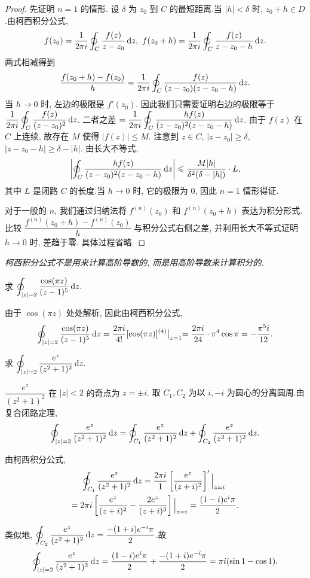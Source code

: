 \documentclass[nocolor,theme=doremi,lang=cn,11pt,chinese,twoside,openright,usesamecnt]{elegantbook}
\newcommand\peq{\mathrel{\phantom{=}}} %
\begin{document}
\begin{proof}
	先证明 $n=1$ 的情形.
	设 $\delta$ 为 $z_0$ 到 $C$ 的最短距离.当 $|h|<\delta$ 时, $z_0+h\in D$.由柯西积分公式,
		\[f(z_0)=\frac1{2\pi i}\oint_C\frac{f(z)}{z-z_0}\diff z,\ 
		f(z_0+h)=\frac1{2\pi i}\oint_C\frac{f(z)}{z-z_0-h}\diff z.\]
	两式相减得到
		\[\frac{f(z_0+h)-f(z_0)}h=\frac1{2\pi i}\oint_C\frac{f(z)}{(z-z_0)(z-z_0-h)}\,\mathrm{d} z.\]
	当 $h\to 0$ 时, 左边的极限是 $f'(z_0)$. 因此我们只需要证明右边的极限等于 $\displaystyle\frac1{2\pi i}\oint_C\frac{f(z)}{(z-z_0)^2}\,\mathrm{d} z$.
	二者之差 $=\displaystyle\frac1{2\pi i}\oint_C\frac{h f(z)}{(z-z_0)^2(z-z_0-h)}\,\mathrm{d} z$.
	由于 $f(z)$ 在 $C$ 上连续, 故存在 $M$ 使得 $|f(z)|\le M$. 注意到 $z\in C$, $|z-z_0|\ge \delta$, $|z-z_0-h|\ge\delta-|h|$. 由长大不等式,
		\[\left|\oint_C\frac{h f(z)}{(z-z_0)^2(z-z_0-h)}\,\mathrm{d} z\right|\leqslant\frac{M|h|}{\delta^2(\delta-|h|)}\cdot L,\]
	其中 $L$ 是闭路 $C$ 的长度.当 $h\to0$ 时, 它的极限为 $0$, 因此 $n=1$ 情形得证.

	对于一般的 $n$, 我们通过归纳法将 $f^{(n)}(z_0)$ 和 $f^{(n)}(z_0+h)$ 表达为积分形式. 比较 $\dfrac{f^{(n)}(z_0+h)-f^{(n)}(z_0)}h$ 与积分公式右侧之差, 并利用长大不等式证明 $h\to 0$ 时, 差趋于零. 具体过程省略.
\end{proof}

\emph{柯西积分公式不是用来计算高阶导数的, 而是用高阶导数来计算积分的.}

\begin{example}
	求 $\displaystyle\oint_{|z|=2}\frac{\cos(\pi z)}{(z-1)^5}\,\mathrm{d} z.$
\end{example}

\begin{solution}
	由于 $\cos(\pi z)$ 处处解析,
	{因此由柯西积分公式,
		\[
		\oint_{|z|=2}\frac{\cos(\pi z)}{(z-1)^5}\,\mathrm{d} z
		=\frac{2\pi i}{4!}[\cos(\pi z)]^{(4)}\big|_{z=1}
		{=\frac{2\pi i}{24}\cdot \pi^4\cos \pi=-\frac{\pi^5 i}{12}.}
		\]}
\end{solution}

\begin{example}
	求 $\displaystyle\oint_{|z|=2}\frac{e^z}{(z^2+1)^2}\,\mathrm{d} z.$
\end{example}

\begin{solution}
	$\dfrac{e^z}{(z^2+1)^2}$ 在 $|z|<2$ 的奇点为 $z=\pm i$.
	{取 $C_1,C_2$ 为以 $i,-i$ 为圆心的分离圆周.由复合闭路定理,
		\[\oint_{|z|=2}\frac{e^z}{(z^2+1)^2}\,\mathrm{d} z
		=\oint_{C_1}\frac{e^z}{(z^2+1)^2}\,\mathrm{d} z
		+\oint_{C_2}\frac{e^z}{(z^2+1)^2}\,\mathrm{d} z.\]}

	由柯西积分公式,
		\begin{align*}
		&\peq\oint_{C_1}\frac{e^z}{(z^2+1)^2}\diff z
		=\frac{2\pi i}{1}\left[\frac{e^z}{(z+i)^2}\right]'\Big|_{z=i}\\
		&{=2\pi i\left[\frac{e^z}{(z+i)^2}-\frac{2e^z}{(z+i)^3}\right]\Big|_{z=i}
		=\frac{(1-i)e^i\pi}2.}
		\end{align*}

	{类似地, $\displaystyle\oint_{C_2}\frac{e^z}{(z^2+1)^2}\,\mathrm{d} z=\frac{-(1+i)e^{-i}\pi}2$.故
		\[\oint_{|z|=2}\frac{e^z}{(z^2+1)^2}\,\mathrm{d} z
		=\frac{(1-i)e^i\pi}2+\frac{-(1+i)e^{-i}\pi}2
		=\pi i(\sin1-\cos1).\]}
\end{solution}
\end{document}
